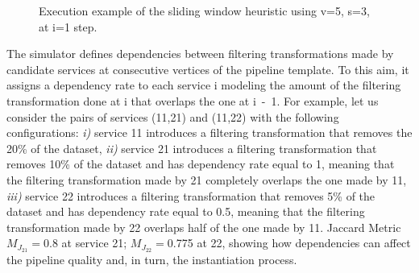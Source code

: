 \begin{figure}[!t]
{
      }
      \caption{Execution example of the sliding window heuristic using v=5, s=3,  at i=1 step.}
      \label{fig:execution_example}
    \end{figure}

    The simulator defines dependencies between filtering transformations made by candidate services at consecutive vertices of the pipeline template.
    To this aim, it assigns a dependency rate to each service \si{i} modeling the amount of the filtering transformation done at \si{i} that overlaps the one at \si{i-1}.
    For example, let us consider the pairs of services (\si{11},\si{21}) and (\si{11},\si{22}) with the following configurations: \emph{i)} service \si{11} introduces a filtering transformation that removes the 20\% of the dataset, \emph{ii)} service \si{21} introduces a filtering transformation that removes 10\% of the dataset and has dependency rate equal to 1, meaning that the filtering transformation made by \si{21} completely overlaps the one made by \si{11}, \emph{iii)} service \si{22} introduces a filtering transformation that removes 5\% of the dataset and has dependency rate equal to 0.5, meaning that the filtering transformation made by \si{22} overlaps half of the one made by \si{11}. Jaccard Metric $M_{J_{21}}$$=$0.8 at service \si{21}; $M_{J_{22}}$$=$0.775 at \si{22}, showing how dependencies can affect the pipeline quality and, in turn, the instantiation process.


